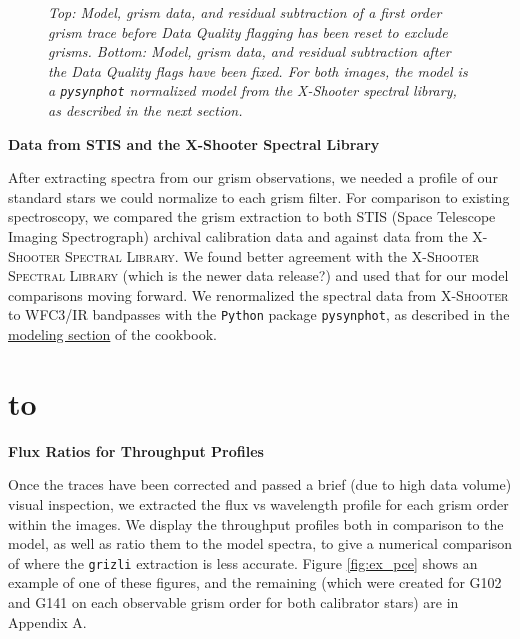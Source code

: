 \documentclass[12pt]{article}
\def\ssectionstar#1{\section*{\hbox to \hsize{\large\bf #1\hfill}}}
\begin{document}
{{\begin{figure}[h!]
\caption{\textit{Top: Model, grism data, and residual subtraction of a first order grism trace before Data Quality flagging 
    has been reset to exclude grisms. Bottom: Model, grism data, and residual subtraction after the Data Quality flags
    have been fixed. For both images, the model is a \texttt{pysynphot} normalized model from the X-Shooter spectral library, 
    as described in the next section.}}
\label{fig:beam_trace}
\end{figure}

{\bf Data from STIS and the X-Shooter Spectral Library}

After extracting spectra from our grism observations, we needed a profile of
our standard stars we could normalize to each grism filter.
For comparison to existing spectroscopy, we compared the grism extraction to both STIS (Space Telescope Imaging Spectrograph) 
archival calibration data and against data from the \textsc{X-Shooter Spectral
Library}. We found better agreement with the \textsc{X-Shooter
Spectral Library} (which is the newer data release?) and used that for our model comparisons moving forward. We renormalized
the spectral data from \textsc{X-Shooter} to WFC3/IR bandpasses with the \texttt{Python} package \texttt{pysynphot}, as described in the
\href{http://grizli-calibration.readthedocs.io/en/latest/objects_models_outputs.html#creating-next-level-models-with-multibeam}{
    \color{blue} modeling section} of the cookbook. 

}

\ssectionstar{Analysis}
\normalsize{

{\bf Flux Ratios for Throughput Profiles}

Once the traces have been corrected and passed a brief (due to high data volume) visual inspection, we extracted 
the flux vs wavelength profile for each grism order within the images. We display the throughput profiles both in comparison
to the model, as well as ratio them to the model spectra, to give a numerical comparison of where the \texttt{grizli} extraction
is less accurate. Figure \ref{fig:ex_pce} shows an example of one of these figures, and the remaining (which were created
for G102 and G141 on each observable grism order for both calibrator stars) are in Appendix A. 

}}
\end{document}
